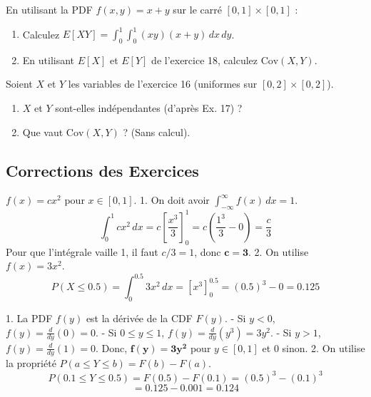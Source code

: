 \begin{exercicebox}
En utilisant la PDF $f(x,y) = x+y$ sur le carré $[0,1]\times[0,1]$ :
\begin{enumerate}
    \item Calculez $E[XY] = \int_0^1 \int_0^1 (xy)(x+y) \, dx \, dy$.
    \item En utilisant $E[X]$ et $E[Y]$ de l'exercice 18, calculez $\text{Cov}(X, Y)$.
\end{enumerate}
\end{exercicebox}

\begin{exercicebox}
Soient $X$ et $Y$ les variables de l'exercice 16 (uniformes sur $[0, 2] \times [0, 2]$).
\begin{enumerate}
    \item $X$ et $Y$ sont-elles indépendantes (d'après Ex. 17) ?
    \item Que vaut $\text{Cov}(X, Y)$ ? (Sans calcul).
\end{enumerate}
\end{exercicebox}

\subsection{Corrections des Exercices}


\begin{correctionbox}
$f(x) = c x^2$ pour $x \in [0, 1]$.
1.  On doit avoir $\int_{-\infty}^{\infty} f(x) \, dx = 1$.
    $$ \int_0^1 c x^2 \, dx = c \left[ \frac{x^3}{3} \right]_0^1 = c \left( \frac{1^3}{3} - 0 \right) = \frac{c}{3} $$
    Pour que l'intégrale vaille 1, il faut $c/3 = 1$, donc $\mathbf{c=3}$.
2.  On utilise $f(x) = 3x^2$.
    $$ P(X \le 0.5) = \int_0^{0.5} 3x^2 \, dx = \left[ x^3 \right]_0^{0.5} = (0.5)^3 - 0 = 0.125 $$
\end{correctionbox}

\begin{correctionbox}
1.  La PDF $f(y)$ est la dérivée de la CDF $F(y)$.
    - Si $y < 0$, $f(y) = \frac{d}{dy}(0) = 0$.
    - Si $0 \le y \le 1$, $f(y) = \frac{d}{dy}(y^3) = 3y^2$.
    - Si $y > 1$, $f(y) = \frac{d}{dy}(1) = 0$.
    Donc, $\mathbf{f(y) = 3y^2}$ pour $y \in [0, 1]$ et 0 sinon.
2.  On utilise la propriété $P(a \le Y \le b) = F(b) - F(a)$.
    $$ P(0.1 \le Y \le 0.5) = F(0.5) - F(0.1) = (0.5)^3 - (0.1)^3 $$
    $$ = 0.125 - 0.001 = 0.124 $$
\end{correctionbox}

